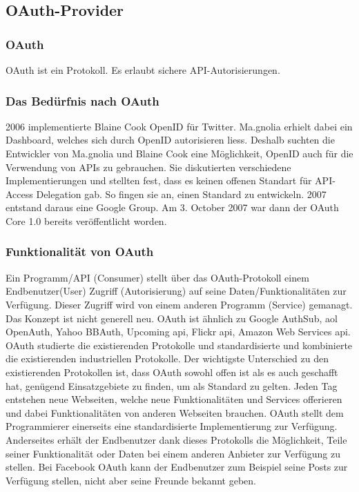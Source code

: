 \hypertarget{oauth-provider}{\subsection{OAuth-Provider}\label{oauth-provider}}

\subsubsection{OAuth}\label{oauth}

OAuth ist ein Protokoll. Es erlaubt sichere API-Autorisierungen.

\subsubsection{Das Bedürfnis nach
OAuth}\label{das-beduxfcrfnis-nach-oauth}

2006 implementierte Blaine Cook OpenID für Twitter. Ma.gnolia erhielt
dabei ein Dashboard, welches sich durch OpenID autorisieren liess.
Deshalb suchten die Entwickler von Ma.gnolia und Blaine Cook eine
Möglichkeit, OpenID auch für die Verwendung von APIs zu gebrauchen. Sie
diskutierten verschiedene Implementierungen und stellten fest, dass es
keinen offenen Standart für API-Access Delegation gab. So fingen sie an,
einen Standard zu entwickeln. 2007 entstand daraus eine Google Group. Am
3. October 2007 war dann der OAuth Core 1.0 bereits veröffentlicht
worden.

\subsubsection{Funktionalität von
OAuth}\label{funktionalituxe4t-von-oauth}

Ein Programm/API (Consumer) stellt über das OAuth-Protokoll einem
Endbenutzer(User) Zugriff (Autorisierung) auf seine
Daten/Funktionalitäten zur Verfügung. Dieser Zugriff wird von einem
anderen Programm (Service) gemanagt. Das Konzept ist nicht generell neu.
OAuth ist ähnlich zu Google AuthSub, aol OpenAuth, Yahoo BBAuth,
Upcoming api, Flickr api, Amazon Web Services api. OAuth studierte die
existierenden Protokolle und standardisierte und kombinierte die
existierenden industriellen Protokolle. Der wichtigste Unterschied zu
den existierenden Protokollen ist, dass OAuth sowohl offen ist als es
auch geschafft hat, genügend Einsatzgebiete zu finden, um als Standard
zu gelten. Jeden Tag entstehen neue Webseiten, welche neue
Funktionalitäten und Services offerieren und dabei Funktionalitäten von
anderen Webseiten brauchen. OAuth stellt dem Programmierer einerseits
eine standardisierte Implementierung zur Verfügung. Anderseites erhält
der Endbenutzer dank dieses Protokolls die Möglichkeit, Teile seiner
Funktionalität oder Daten bei einem anderen Anbieter zur Verfügung zu
stellen. Bei Facebook OAuth kann der Endbenutzer zum Beispiel seine
Posts zur Verfügung stellen, nicht aber seine Freunde bekannt geben.

